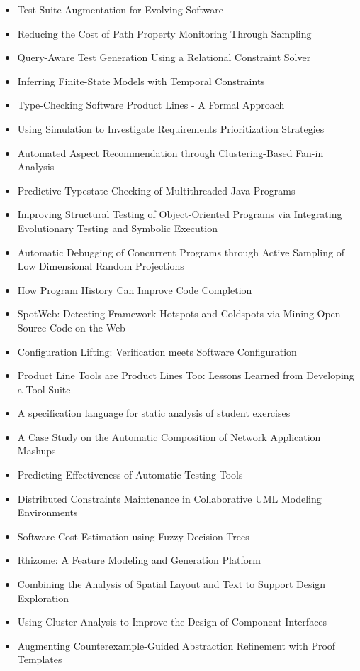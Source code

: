 {\begin{itemize}[itemsep=-1ex]
  \item Test-Suite Augmentation for Evolving Software
  \item Reducing the Cost of Path Property Monitoring Through Sampling
  \item Query-Aware Test Generation Using a Relational Constraint Solver
  \item Inferring Finite-State Models with Temporal Constraints
  \item Type-Checking Software Product Lines - A Formal Approach
  \item Using Simulation to Investigate Requirements Prioritization Strategies
  \item Automated Aspect Recommendation through Clustering-Based Fan-in Analysis
  \item Predictive Typestate Checking of Multithreaded Java Programs
  \item Improving Structural Testing of Object-Oriented Programs via Integrating Evolutionary Testing and Symbolic Execution
  \item Automatic Debugging of Concurrent Programs through Active Sampling of Low Dimensional Random Projections
  \item How Program History Can Improve Code Completion
  \item SpotWeb: Detecting Framework Hotspots and Coldspots via Mining Open Source Code on the Web
  \item Configuration Lifting: Verification meets Software Configuration
  \item Product Line Tools are Product Lines Too: Lessons Learned from Developing a Tool Suite
  \item A specification language for static analysis of student exercises
  \item A Case Study on the Automatic Composition of Network Application Mashups
  \item Predicting Effectiveness of Automatic Testing Tools
  \item Distributed Constraints Maintenance in Collaborative UML Modeling Environments
  \item Software Cost Estimation using Fuzzy Decision Trees
  \item Rhizome: A Feature Modeling and Generation Platform
  \item Combining the Analysis of Spatial Layout and Text to Support Design Exploration
  \item Using Cluster Analysis to Improve the Design of Component Interfaces
  \item Augmenting Counterexample-Guided Abstraction Refinement with Proof Templates

\end{itemize}}
